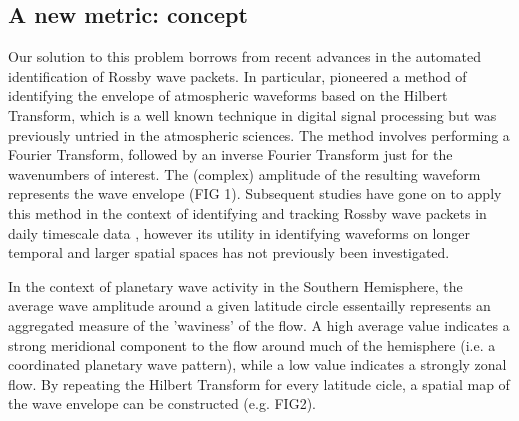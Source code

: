 \subsection{A new metric: concept}

Our solution to this problem borrows from recent advances in the automated identification of Rossby wave packets. In particular, \citet{Zimin2003} pioneered a method of identifying the envelope of atmospheric waveforms based on the Hilbert Transform, which is a well known technique in digital signal processing but was previously untried in the atmospheric sciences. The method involves performing a Fourier Transform, followed by an inverse Fourier Transform just for the wavenumbers of interest. The (complex) amplitude of the resulting waveform represents the wave envelope (FIG 1). Subsequent studies have gone on to apply this method in the context of identifying and tracking Rossby wave packets in daily timescale data \citep{Glatt2014,Souders2014a}, however its utility in identifying waveforms on longer temporal and larger spatial spaces has not previously been investigated.

In the context of planetary wave activity in the Southern Hemisphere, the average wave amplitude around a given latitude circle essentailly represents an aggregated measure of the 'waviness' of the flow. A high average value indicates a strong meridional component to the flow around much of the hemisphere (i.e. a coordinated planetary wave pattern), while a low value indicates a strongly zonal flow. By repeating the Hilbert Transform for every latitude cicle, a spatial map of the wave envelope can be constructed (e.g. FIG2).


